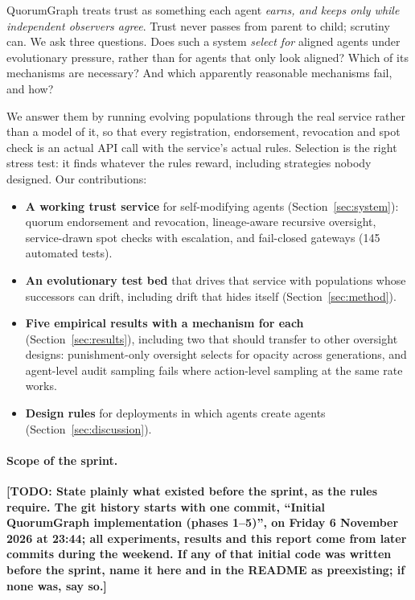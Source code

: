 \documentclass[11pt]{article}
\newcommand{\todo}[1]{{\color{red}\textbf{[TODO: #1]}}}
\begin{document}
QuorumGraph treats trust as something each agent \emph{earns, and keeps only while
independent observers agree}. Trust never passes from parent to child; scrutiny can. We ask
three questions. Does such a system \emph{select for} aligned agents under evolutionary
pressure, rather than for agents that only look aligned? Which of its mechanisms are
necessary? And which apparently reasonable mechanisms fail, and how?

We answer them by running evolving populations through the real service rather than a model
of it, so that every registration, endorsement, revocation and spot check is an actual API
call with the service's actual rules. Selection is the right stress test: it finds whatever
the rules reward, including strategies nobody designed. Our contributions:
\begin{itemize}
  \item \textbf{A working trust service} for self-modifying agents (Section~\ref{sec:system}):
  quorum endorsement and revocation, lineage-aware recursive oversight, service-drawn spot
  checks with escalation, and fail-closed gateways (145 automated tests).
  \item \textbf{An evolutionary test bed} that drives that service with populations whose
  successors can drift, including drift that hides itself (Section~\ref{sec:method}).
  \item \textbf{Five empirical results with a mechanism for each} (Section~\ref{sec:results}),
  including two that should transfer to other oversight designs: punishment-only oversight
  selects for opacity across generations, and agent-level audit sampling fails where
  action-level sampling at the same rate works.
  \item \textbf{Design rules} for deployments in which agents create agents
  (Section~\ref{sec:discussion}).
\end{itemize}

\paragraph{Scope of the sprint.} \todo{State plainly what existed before the sprint, as the
rules require. The git history starts with one commit, ``Initial QuorumGraph implementation
(phases 1--5)'', on Friday 6 November 2026 at 23:44; all experiments, results and this report
come from later commits during the weekend. If any of that initial code was written before
the sprint, name it here and in the README as preexisting; if none was, say so.}
\end{document}
